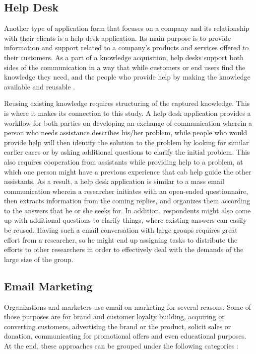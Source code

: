 \subsection{Help Desk}
\label{subsec:3.1.2:HelpDeskSoft}
Another type of application form that focuses on a company and its relationship with their clients is a help desk application. Its main purpose is to provide information and support related to a company's products and services offered to their customers. As a part of a knowledge acquisition, help desks support both sides of the communication in a way that while customers or end users find the knowledge they need, and the people who provide help by making the knowledge available and reusable \citep{Halverson2004}.
\vspace{1cm}

Reusing existing knowledge requires structuring of the captured knowledge. This is where it makes its connection to this study. A help desk application provides a workflow for both parties on developing an exchange of communication wherein a person who needs assistance describes his/her problem, while people who would provide help will then identify the solution to the problem by looking for similar earlier cases or by asking additional questions to clarify the initial problem. This also requires cooperation from assistants while providing help to a problem, at which one person might have a previous experience that cab help guide the other assistants. As a result, a help desk application is similar to a mass email communication wherein a researcher initiates with an open-ended questionnaire, then extracts information from the coming replies, and organizes them according to the answers that he or she seeks for. In addition, respondents might also come up with additional questions to clarify things, where existing answers can easily be reused. Having such a email conversation with large groups requires great effort from a researcher, so he might end up assigning tasks to distribute the efforts to other researchers in order to effectively deal with the demands of the large size of the group.


\subsection{Email Marketing}
\label{subsec:3.1.3:EmaiMarkt}
Organizations and marketers use email on marketing for several reasons. Some of those purposes are for brand and customer loyalty building, acquiring or converting customers, advertising the brand or the product, solicit sales or donation, communicating for promotional offers and even educational purposes. At the end, these approaches can be grouped under the following categories \citep{Eley2009}:

